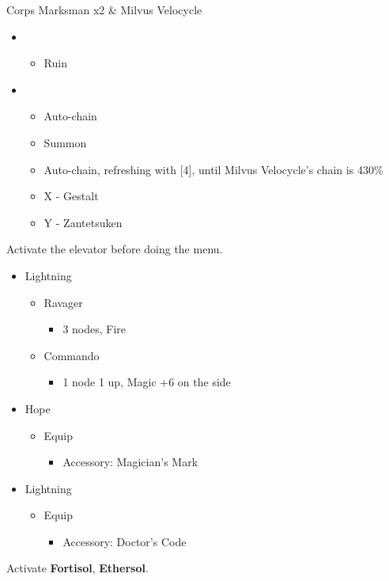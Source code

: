 \documentclass{report}
\begin{document}
\begin{battle}{Corps Marksman x2 \& Milvus Velocycle}
\begin{itemize}
    \item \first
    \begin{itemize}
        \item Ruin
    \end{itemize}
    \item \fifth
    \begin{itemize}
        \item Auto-chain
        \item Summon
        \item Auto-chain, refreshing with [4], until Milvus Velocycle's chain is 430\%
        \item X - Gestalt
        \item Y - Zantetsuken
    \end{itemize}
\end{itemize}
\end{battle}
Activate the elevator before doing the menu.
\begin{menu}
\begin{itemize}
    \crystarium
    \begin{itemize}
        \item Lightning
        \begin{itemize}
            \item Ravager
            \begin{itemize}
                \item 3 nodes, Fire
            \end{itemize}
            \item Commando
            \begin{itemize}
                \item 1 node 1 up, Magic +6 on the side
            \end{itemize}
        \end{itemize}
    \end{itemize}
    \equip
    \begin{itemize}
        \item Hope
        \begin{itemize}
            \item Equip
            \begin{itemize}
                \item Accessory: Magician's Mark
            \end{itemize}
        \end{itemize}
        \item Lightning
        \begin{itemize}
            \item Equip
            \begin{itemize}
                \item Accessory: Doctor's Code
            \end{itemize}
        \end{itemize}
    \end{itemize}
\end{itemize}
\end{menu}
Activate \textbf{Fortisol}, \textbf{Ethersol}.
\end{document}
